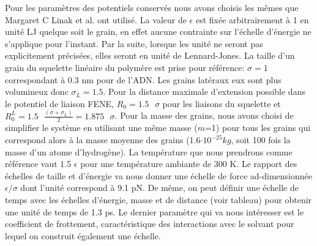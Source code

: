 Pour les paramètres des potentiels conservés nous avons choisis les mêmes que Margaret C Linak et al. \cite{jchem} ont utilisé. La valeur de $\epsilon$ est fixée arbitrairement à 1 en unité LJ quelque soit le grain, en effet aucune contrainte sur l'échelle d'énergie ne s'applique pour l'instant. Par la suite, lorsque les unité ne seront pas explicitement précisées, elles seront en unité de Lennard-Jones. La taille d'un grain du squelette linéaire du polymère est prise pour référence: $\sigma=1$ correspondant à 0.3 nm pour de l'ADN. Les grains latéraux eux sont plus volumineux donc $\sigma_{L}=1.5$. Pour la distance maximale d'extension possible dans le potentiel de liaison FENE, $R_0=1.5\text{ } \sigma$ pour les liaisons du squelette et $R_0^{L}=1.5 \text{ }\frac{(\sigma+\sigma_{L})}{2} = 1.875\text{ } \sigma$. Pour la masse des grains, nous avons choisi  de simplifier le système en utilisant une même masse ($m$=1) pour tous les grains qui correspond alors à la masse moyenne des grains (1.6$\cdot 10^{-25} kg$, soit 100 fois la masse d'un atome d'hydrogène). La température que nous prendrons comme référence vaut 1.5 $\epsilon$ pour une température ambiante de 300 K. Le rapport des échelles de taille et d'énergie va nous donner une échelle de force ad-dimensionnée $\epsilon/\sigma$ dont l'unité correspond à 9.1 pN. De même, on peut définir une échelle de temps avec les échelles d'énergie, masse et de distance (voir tableau) pour obtenir une unité de temps de 1.3 ps. Le dernier paramètre qui va nous intéresser est le coefficient de frottement, caractéristique des interactions avec le solvant pour lequel on construit également une échelle.








